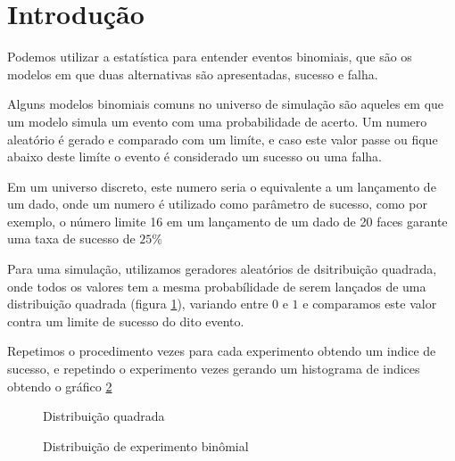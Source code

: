 \section{Introdu\c{c}\~{a}o}

Podemos utilizar a estat\'{i}stica para entender eventos binomiais, que s\~{a}o os modelos
em que duas alternativas s\~{a}o apresentadas, sucesso e falha.

Alguns modelos binomiais comuns no universo de simula\c{c}\~{a}o
s\~{a}o aqueles em que um modelo simula um evento com uma probabilidade de acerto.
Um numero aleat\'{o}rio \'{e} gerado
e comparado com um lim\'{i}te, e caso este valor passe ou
fique abaixo deste lim\'{i}te o evento \'{e} considerado um sucesso ou uma falha.

Em um universo discreto, este numero seria o equivalente a um lan\c{c}amento de um dado,
onde um numero \'{e} utilizado como par\^{a}metro de sucesso, como por exemplo, o número limite 16
em um lan\c{c}amento de um dado de 20 faces garante uma taxa de sucesso de $25\%$

Para uma simula\c{c}\~{a}o, utilizamos geradores aleat\'{o}rios de dsitribui\c{c}\~{a}o quadrada, onde
todos os valores tem a mesma probabílidade de serem lan\c{c}ados
de uma distribui\c{c}\~{a}o quadrada (figura \ref{intro:squared}), variando entre $0$ e $1$
e comparamos este valor contra um limite de sucesso do dito evento.

Repetimos o procedimento \introexperimentsize{} vezes para cada experimento obtendo um indice de sucesso,
e repetindo o experimento \introexperimentrepeats{} vezes gerando um histograma de indices obtendo o gr\'{a}fico
\ref{intro:binomial}

\begin{center}
\begin{figure}[H]
\begin{center}
\label{intro:squared}
\caption{Distribui\c{c}\~ao quadrada}
\end{center}
\end{figure}
\end{center}

\begin{center}
\begin{figure}[H]
\begin{center}
\label{intro:binomial}
\caption{Distribui\c{c}\~ao de experimento bin\^omial}
\end{center}
\end{figure}
\end{center}
